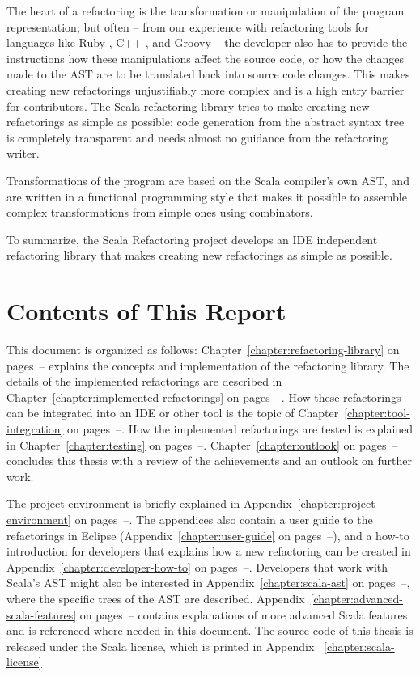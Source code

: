 \documentclass[10pt,a4paper,oneside]{scrreprt}
\begin{document}
The heart of a refactoring is the transformation or manipulation of the program representation; but often -- from our experience with refactoring tools for languages like Ruby \cite{RubyRefactoring}, C++ \cite{CdtOopsla}, and Groovy \cite{GroovyOopsla} -- the developer also has to provide the instructions how these manipulations affect the source code, or how the changes made to the AST are to be translated back into source code changes. This makes creating new refactorings unjustifiably more complex and is a high entry barrier for contributors. The Scala refactoring library tries to make creating new refactorings as simple as possible: code generation from the abstract syntax tree is completely transparent and needs almost no guidance from the refactoring writer.

Transformations of the program are based on the Scala compiler's own AST, and are written in a functional programming style that makes it possible to assemble complex transformations from simple ones using combinators.

To summarize, the Scala Refactoring project develops an IDE independent refactoring library that makes creating new refactorings as simple as possible.

\section{Contents of This Report}

\newcommand{\rref}[2]{\ref{#1} on pages~\pageref{#1}--\pageref{#2}}

This document is organized as follows: Chapter~\rref{chapter:refactoring-library}{end-chapter:refactoring-library} explains the concepts and implementation of the refactoring library. The details of the implemented refactorings are described in Chapter~\rref{chapter:implemented-refactorings}{end-chapter:implemented-refactorings}. How these refactorings can be integrated into an IDE or other tool is the topic of Chapter~\rref{chapter:tool-integration}{end-chapter:tool-integration}. How the implemented refactorings are tested is explained in Chapter~\rref{chapter:testing}{end-chapter:testing}. Chapter~\rref{chapter:outlook}{end-chapter:outlook} concludes this thesis with a review of the achievements and an outlook on further work.

The project environment is briefly explained in Appendix~\rref{chapter:project-environment}{end-chapter:project-environment}. The appendices also contain a user guide to the refactorings in Eclipse (Appendix~\rref{chapter:user-guide}{end-chapter:user-guide}), and a how-to introduction for developers that explains how a new refactoring can be created in Appendix~\rref{chapter:developer-how-to}{end-chapter:developer-how-to}. Developers that work with Scala's AST might also be interested in Appendix~\rref{chapter:scala-ast}{end-chapter:scala-ast}, where the specific trees of the AST are described. Appendix~\rref{chapter:advanced-scala-features}{end-chapter:advanced-scala-features} contains explanations of more advanced Scala features and is referenced where needed in this document. The source code of this thesis is released under the Scala license, which is printed in Appendix~ \vref{chapter:scala-license}
\end{document}
